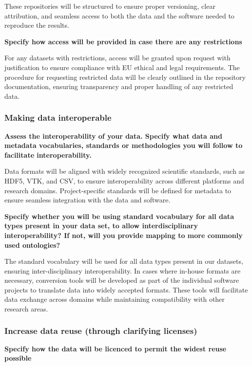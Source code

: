\documentclass[a4paper,12pt]{article}
\begin{document}
These repositories will be structured to ensure proper versioning, clear attribution, and seamless access to both the data and the software needed to reproduce the results.


\noindent \textbf{Specify how access will be provided in case there are any restrictions}

For any datasets with restrictions, access will be granted upon request with justification to ensure compliance with EU ethical and legal requirements. The procedure for requesting restricted data will be clearly outlined in the repository documentation, ensuring transparency and proper handling of any restricted data.

\subsubsection{Making data interoperable}

\noindent \textbf{Assess the interoperability of your data. Specify what data and metadata vocabularies, standards or methodologies you will follow to facilitate interoperability.}

Data formats will be aligned with widely recognized scientific standards, such as HDF5, VTK, and CSV, to ensure interoperability across different platforms and research domains. Project-specific standards will be defined for metadata to ensure seamless integration with the data and software.

\noindent \textbf{Specify whether you will be using standard vocabulary for all data types present in your data set, to allow interdisciplinary interoperability? If not, will you provide mapping to more commonly used ontologies?}

The standard vocabulary will be used for all data types present in our datasets, ensuring inter-disciplinary interoperability. In cases where in-house formats are necessary, conversion tools will be developed as part of the individual software projects to translate data into widely accepted formats. These tools will facilitate data exchange across domains while maintaining compatibility with other research areas.



\subsubsection{Increase data reuse (through clarifying licenses)}

\noindent \textbf{Specify how the data will be licenced to permit the widest reuse possible}
\end{document}
